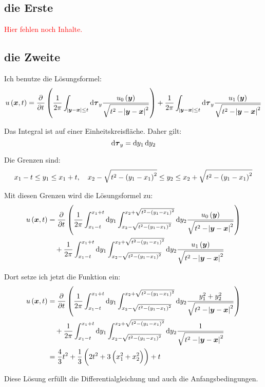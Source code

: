 \documentclass[11pt, ngerman, fleqn]{article}
\newcommand{\fehlt}{\textcolor{red}{Hier fehlen noch Inhalte.}}
\renewcommand{\vec}[1]{\boldsymbol{#1}}
\begin{document}
\subsection{die Erste}

\fehlt

\subsection{die Zweite}

Ich benutze die Lösungsformel:
\[
	u\del{\vec x, t} = \dpd{}t \del{
		\frac{1}{2 \pi} \int_{\abs{\vec y - \vec x} \leq t} \dif \vec \tau_y \frac{u_0\del{\vec y}}{\sqrt{t^2 - \abs{\vec y - \vec x}^2}}
	}
	+
	\frac{1}{2 \pi} \int_{\abs{\vec y - \vec x} \leq t} \dif \vec \tau_y \frac{u_1\del{\vec y}}{\sqrt{t^2 - \abs{\vec y - \vec x}^2}}
\]

Das Integral ist auf einer Einheitskreisfläche. Daher gilt:
\[
	\dif \vec \tau_y = \dif y_1 \dif y_2
\]

Die Grenzen sind:
\[
	x_1 - t \leq y_1 \leq x_1 + t
	,\quad
	x_2 - \sqrt{t^2-\del{y_1 - x_1}^2} \leq y_2 \leq x_2 + \sqrt{t^2-\del{y_1 - x_1}^2}
\]

Mit diesen Grenzen wird die Lösungsformel zu:
\begin{align*}
	u\del{\vec x, t} &= \dpd{}t \del{
		\frac{1}{2 \pi}
		\int_{x_1 - t}^{x_1 + t} \dif y_1
		\int_{x_2 - \sqrt{t^2-\del{y_1 - x_1}^2}}^{x_2 + \sqrt{t^2-\del{y_1 - x_1}^2}} \dif y_2
		\frac{u_0\del{\vec y}}{\sqrt{t^2 - \abs{\vec y - \vec x}^2}}
	} \\
	&\quad+
	\frac{1}{2 \pi}
	\int_{x_1 - t}^{x_1 + t} \dif y_1
	\int_{x_2 - \sqrt{t^2-\del{y_1 - x_1}^2}}^{x_2 + \sqrt{t^2-\del{y_1 - x_1}^2}} \dif y_2
	\frac{u_1\del{\vec y}}{\sqrt{t^2 - \abs{\vec y - \vec x}^2}}
\end{align*}

Dort setze ich jetzt die Funktion ein:
\begin{align*}
	u\del{\vec x, t} &= \dpd{}t \del{
		\frac{1}{2 \pi}
		\int_{x_1 - t}^{x_1 + t} \dif y_1
		\int_{x_2 - \sqrt{t^2-\del{y_1 - x_1}^2}}^{x_2 + \sqrt{t^2-\del{y_1 - x_1}^2}} \dif y_2
		\frac{y_1^2 + y_2^2}{\sqrt{t^2 - \abs{\vec y - \vec x}^2}}
	} \\
	&\quad+
	\frac{1}{2 \pi}
	\int_{x_1 - t}^{x_1 + t} \dif y_1
	\int_{x_2 - \sqrt{t^2-\del{y_1 - x_1}^2}}^{x_2 + \sqrt{t^2-\del{y_1 - x_1}^2}} \dif y_2
	\frac{1}{\sqrt{t^2 - \abs{\vec y - \vec x}^2}} \\
	&= \frac 43 t^2 + \frac 13 \del{2t^2 + 3 \del{x_1^2 + x_2^2}} + t
\end{align*}

Diese Lösung erfüllt die Differentialgleichung und auch die Anfangsbedingungen.

%
%
\end{document}
